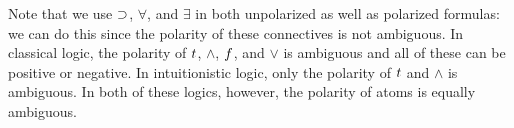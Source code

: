 
%

%
Note that we use $\supset$, $\forall$, and $\exists$ in both unpolarized
as well as polarized formulas: we can do this since the polarity of
these connectives is not ambiguous.
%
In classical logic, the polarity of $t\/$, $\wedge$, $f\/$, and
$\vee$ is ambiguous and all of these can be positive or negative.
%
In intuitionistic logic, only the polarity of $t\/$ and $\wedge$
is ambiguous.
%
In both of these logics, however, the polarity of atoms is equally
ambiguous.
%


